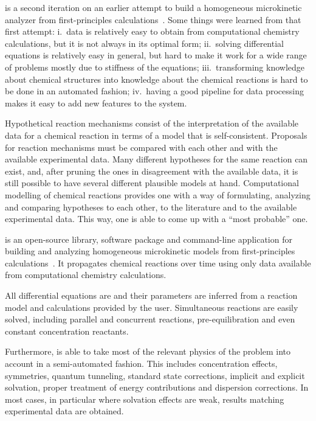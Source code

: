 \overreact{} is a second iteration on an earlier attempt to build a
homogeneous microkinetic analyzer from first-principles
calculations~\cite{pyrrole2019zenodo}.
Some things were learned from that first attempt:
i.\ data is relatively easy to obtain from computational chemistry calculations,
but it is not always in its optimal form;
ii.\ solving differential equations is relatively easy in general,
but hard to
make it work for a wide range of problems mostly due to stiffness of the
equations;
iii.\ transforming knowledge about chemical structures into knowledge about the
chemical reactions is hard to be done in an automated fashion;
iv.\ having a good pipeline for data processing makes it easy to add new
features to the system.

Hypothetical reaction mechanisms consist of
the interpretation of the available data for a chemical reaction
in terms of a model that is self-consistent.
Proposals for reaction mechanisms must be compared
with each other
and with the available experimental data.
Many different hypotheses for the same reaction can exist,
and,
after pruning the ones in disagreement with the available data,
it is still possible to have several different plausible models at hand.
Computational modelling of chemical reactions
provides one with a way of
formulating,
analyzing and
comparing hypotheses to each other,
to the literature and to the available experimental data.
This way,
one is able to come up with a ``most probable'' one.

\overreact{} is an open-source library,
software package and command-line
application for building and analyzing
homogeneous microkinetic models from first-principles
calculations~\cite{Schneider_2022,overreact2021zenodo}.
It propagates chemical reactions over time using only data available from
computational chemistry calculations.

All differential equations are and their parameters are inferred from a
reaction model and calculations provided by the user.
Simultaneous reactions are easily solved,
including parallel and concurrent
reactions,
pre-equilibration and even constant concentration reactants.

Furthermore,
\overreact{} is able to take most of the relevant physics of the problem into
account in a semi-automated fashion.
This includes concentration effects,
symmetries,
quantum
tunneling,
standard state corrections,
implicit and explicit solvation,
proper treatment
of energy contributions and dispersion corrections.
In most cases,
in particular where solvation effects are weak,
results matching
experimental data are obtained.


